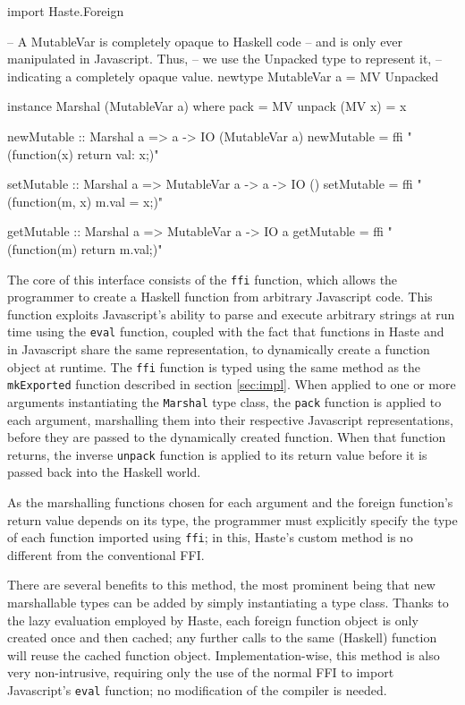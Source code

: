 \documentclass[preprint]{sigplanconf}
\begin{document}
\begin{listingfloat}
\begin{code}
import Haste.Foreign

-- A MutableVar is completely opaque to Haskell code
-- and is only ever manipulated in Javascript. Thus,
-- we use the Unpacked type to represent it,
-- indicating a completely opaque value.
newtype MutableVar a = MV Unpacked

instance Marshal (MutableVar a) where
  pack          = MV
  unpack (MV x) = x

newMutable :: Marshal a => a -> IO (MutableVar a)
newMutable = ffi "(function(x) {return {val: x};})"

setMutable :: Marshal a => MutableVar a -> a -> IO ()
setMutable = ffi "(function(m, x) {m.val = x;})"

getMutable :: Marshal a => MutableVar a -> IO a
getMutable = ffi "(function(m) {return m.val;})"
\end{code}
\caption{Mutable variables with \lstinline!Haste.Foreign!}
\label{lst:ffi}
\end{listingfloat}

The core of this interface consists of the \lstinline!ffi! function, which
allows the programmer to create a Haskell function from arbitrary Javascript
code. This function exploits Javascript's ability to parse and execute
arbitrary strings at run time using the \lstinline!eval! function, coupled with
the fact that functions in Haste and in Javascript share the same
representation, to dynamically create a function object at runtime.
The \lstinline!ffi! function is typed using the same method as the
\lstinline!mkExported! function described in section \ref{sec:impl}.
When applied to one or more arguments instantiating the \lstinline!Marshal!
type class, the \lstinline!pack! function is applied to each argument,
marshalling them into their respective Javascript representations, before they
are passed to the dynamically created function. When that function returns,
the inverse \lstinline!unpack! function is applied to its return value before
it is passed back into the Haskell world.

As the marshalling functions chosen for each argument and the foreign
function's return value depends on its type, the programmer must explicitly
specify the type of each function imported using \lstinline!ffi!; in this,
Haste's custom method is no different from the conventional FFI.

There are several benefits to this method, the most prominent being that new
marshallable types can be added by simply instantiating a type class. Thanks
to the lazy evaluation employed by Haste, each foreign function object is only
created once and then cached; any further calls to the same (Haskell) function
will reuse the cached function object. Implementation-wise, this method is also
very non-intrusive, requiring only the use of the normal FFI to import
Javascript's \lstinline!eval! function; no modification of the compiler is
needed.
\end{document}
